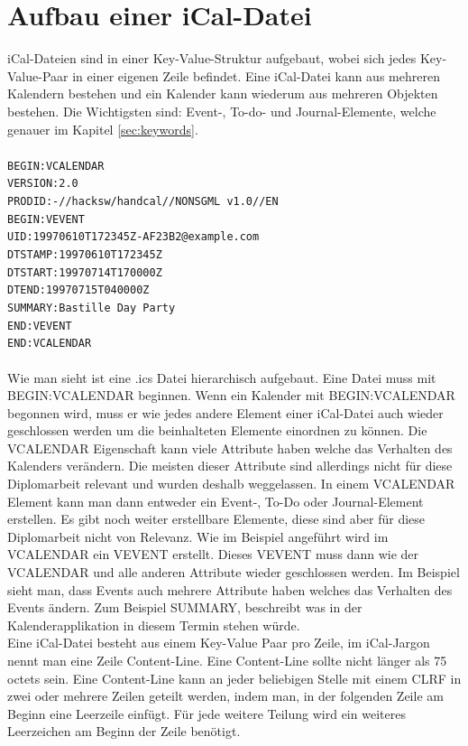 \section{Aufbau einer iCal-Datei}
\label{sec:aufbauEineriCalDatei}
iCal-Dateien sind in einer Key-Value-Struktur aufgebaut, wobei sich jedes Key-Value-Paar in einer eigenen Zeile befindet. Eine iCal-Datei kann aus mehreren Kalendern bestehen und ein Kalender kann wiederum aus mehreren Objekten bestehen. Die Wichtigsten sind: Event-, To-do- und Journal-Elemente, welche genauer im Kapitel \ref{sec:keywords}.\\\\
\texttt{BEGIN:VCALENDAR\\
 VERSION:2.0\\
 PRODID:-//hacksw/handcal//NONSGML v1.0//EN\\
 BEGIN:VEVENT\\
 UID:19970610T172345Z-AF23B2@example.com\\
 DTSTAMP:19970610T172345Z\\
 DTSTART:19970714T170000Z\\
 DTEND:19970715T040000Z\\
 SUMMARY:Bastille Day Party\\
 END:VEVENT\\
 END:VCALENDAR}\\\\
Wie man sieht ist eine .ics Datei hierarchisch aufgebaut. Eine Datei muss mit BEGIN:VCALENDAR beginnen. Wenn ein Kalender mit BEGIN:VCALENDAR begonnen wird, muss er wie jedes andere Element einer iCal-Datei auch wieder geschlossen werden um die beinhalteten Elemente einordnen zu können. Die VCALENDAR Eigenschaft kann viele Attribute haben welche das Verhalten des Kalenders verändern. Die meisten dieser Attribute sind allerdings nicht für diese Diplomarbeit relevant und wurden deshalb weggelassen. In einem VCALENDAR Element kann man dann entweder ein Event-, To-Do oder Journal-Element erstellen. Es gibt noch weiter erstellbare Elemente, diese sind aber für diese Diplomarbeit nicht von Relevanz. Wie im Beispiel angeführt wird im VCALENDAR ein VEVENT erstellt. Dieses VEVENT muss dann wie der VCALENDAR und alle anderen Attribute wieder geschlossen werden. Im Beispiel sieht man, dass Events auch mehrere Attribute haben welches das Verhalten des Events ändern. Zum Beispiel SUMMARY, beschreibt was in der Kalenderapplikation in diesem Termin stehen würde.\\
Eine iCal-Datei besteht aus einem Key-Value Paar pro Zeile, im iCal-Jargon nennt man eine Zeile Content-Line. Eine Content-Line sollte nicht länger als 75 octets sein. Eine Content-Line kann an jeder beliebigen Stelle mit einem CLRF in zwei oder mehrere Zeilen geteilt werden, indem man, in der folgenden Zeile am Beginn eine Leerzeile einfügt. Für jede weitere Teilung wird ein weiteres Leerzeichen am Beginn der Zeile benötigt. \\\\
